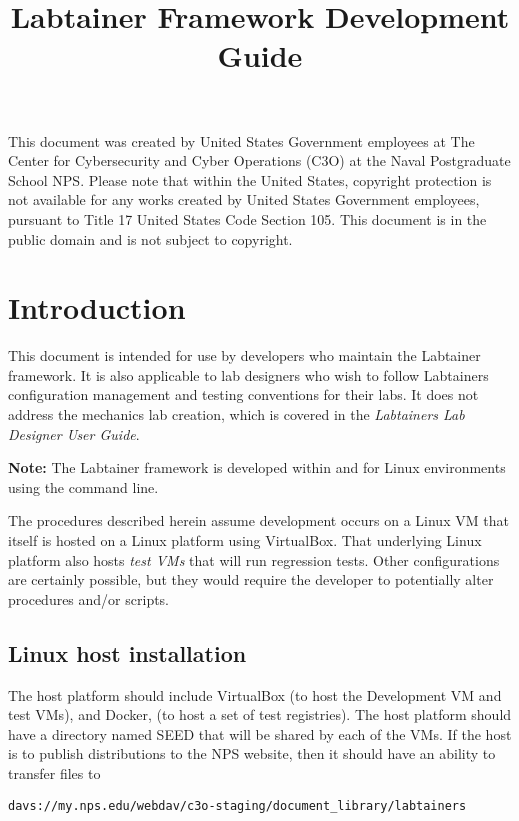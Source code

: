 \documentclass[12pt]{article}
\begin{document}
\begin{titlepage}
\title {Labtainer Framework Development Guide}
\maketitle

\vspace{2.0in}
This document was created by United States Government employees at 
The Center for Cybersecurity and Cyber Operations (C3O) at the Naval Postgraduate School NPS. 
Please note that within the United States, copyright protection is not available for any works created  
by United States Government employees, pursuant to Title 17 United States Code Section 105.   
This document is in the public domain and is not subject to copyright. 
\end{titlepage}
\tableofcontents
\newpage
\section {Introduction}
This document is intended for use by developers who maintain the
Labtainer framework.  It is also applicable to lab designers who wish
to follow Labtainers configuration management and testing conventions for  their labs.
It does not address the mechanics lab creation, which is 
covered in the \textit {Labtainers Lab Designer User Guide}.

\begin{flushleft} 
{\bf Note:} 
The Labtainer framework is developed within and for Linux environments using the command line.
\end{flushleft} 

The procedures described herein assume development occurs on a Linux VM that itself is hosted on
a Linux platform using VirtualBox.  That underlying Linux platform also hosts \textit{test VMs} that
will run regression tests.  Other configurations are certainly possible, but they would require the
developer to potentially alter procedures and/or scripts.

\subsection{Linux host installation}
The host platform should include VirtualBox (to host the Development VM and test VMs),  and Docker, 
(to host a set of test registries).  The host platform should have a directory named SEED that will
be shared by each of the VMs.  If the host is to publish distributions to the NPS website, then it should
have an ability to transfer files to 
\begin{verbatim}
davs://my.nps.edu/webdav/c3o-staging/document_library/labtainers
\end{verbatim}
\end{document}
